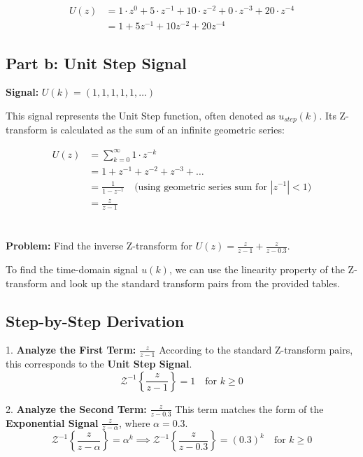 \documentclass[a4paper,12pt]{article}
\begin{document}
\begin{align*}
    U(z) &= 1 \cdot z^0 + 5 \cdot z^{-1} + 10 \cdot z^{-2} + 0 \cdot z^{-3} + 20 \cdot z^{-4} \\
         &= 1 + 5z^{-1} + 10z^{-2} + 20z^{-4}
\end{align*}

\subsection{Part b: Unit Step Signal}
\textbf{Signal:} $U(k) = (1, 1, 1, 1, 1, \dots)$

This signal represents the Unit Step function, often denoted as $u_{step}(k)$. Its Z-transform is calculated as the sum of an infinite geometric series:

\begin{align*}
    U(z) &= \sum_{k=0}^{\infty} 1 \cdot z^{-k} \\
         &= 1 + z^{-1} + z^{-2} + z^{-3} + \dots \\
         &= \frac{1}{1 - z^{-1}} \quad \text{(using geometric series sum for } |z^{-1}| < 1 \text{)} \\
         &= \frac{z}{z - 1}
\end{align*}


\section{}

\textbf{Problem:} Find the inverse Z-transform for $U(z) = \frac{z}{z-1} + \frac{z}{z-0.3}$.

To find the time-domain signal $u(k)$, we can use the linearity property of the Z-transform and look up the standard transform pairs from the provided tables.

\subsection{Step-by-Step Derivation}

1.  \textbf{Analyze the First Term:} $\frac{z}{z-1}$
    According to the standard Z-transform pairs, this corresponds to the \textbf{Unit Step Signal}.
    $$ \mathcal{Z}^{-1}\left\{ \frac{z}{z-1} \right\} = 1 \quad \text{for } k \ge 0 $$

2.  \textbf{Analyze the Second Term:} $\frac{z}{z-0.3}$
    This term matches the form of the \textbf{Exponential Signal} $\frac{z}{z-\alpha}$, where $\alpha = 0.3$.
    $$ \mathcal{Z}^{-1}\left\{ \frac{z}{z-\alpha} \right\} = \alpha^k \implies \mathcal{Z}^{-1}\left\{ \frac{z}{z-0.3} \right\} = (0.3)^k \quad \text{for } k \ge 0 $$
\end{document}
